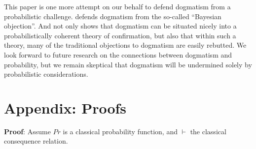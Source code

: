 This paper is one more attempt on our behalf to defend dogmatism from a probabilistic challenge.  \citet{Weatherson2007} defends dogmatism from the so-called ``Bayesian objection''.  And \citet{JehlePhD} not only shows that dogmatism can be situated nicely into a probabilistically coherent theory of confirmation, but also that within such a theory, many of the traditional objections to dogmatism are easily rebutted.  We look forward to future research on the connections between dogmatism and probability, but we remain skeptical that dogmatism will be undermined solely by probabilistic considerations.  


%







%
%
%
%
%
%


\section*{Appendix: Proofs}
\TheoremOne

\noindent \textbf{Proof}: Assume $Pr$ is a classical probability function, and $\vdash$ the classical consequence relation. 

